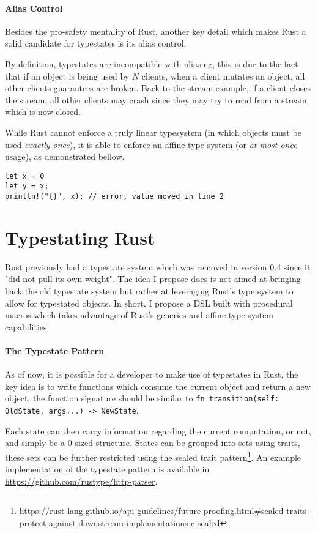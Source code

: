 \documentclass{article}
\begin{document}
\paragraph{Alias Control}

Besides the pro-safety mentality of Rust,
another key detail which makes Rust a solid candidate for typestates is its alias control.

By definition, typestates are incompatible with aliasing,
this is due to the fact that if an object is being used by $N$ clients,
when a client mutates an object, all other clients guarantees are broken.
Back to the stream example, if a client closes the stream,
all other clients may crash since they may try to read from a stream which is now closed.

While Rust cannot enforce a truly linear typesystem (in which objects must be used \emph{exactly once}),
it is able to enforce an affine type system (or \emph{at most once} usage), as demonstrated bellow.


\begin{verbatim}
let x = 0
let y = x;
println!("{}", x); // error, value moved in line 2
\end{verbatim}

\section*{Typestating Rust}

Rust previously had a typestate system which was removed in version 0.4 since it "did not pull its own weight".
The idea I propose does is not aimed at bringing back the old typestate system but rather at leveraging Rust's type system to allow for typestated objects.
In short, I propose a DSL built with procedural macros which takes advantage of Rust's generics and affine type system capabilities.

\paragraph{The Typestate Pattern}

As of now, it is possible for a developer to make use of typestates in Rust,
the key idea is to write functions which consume the current object and return a new object,
the function signature should be similar to \texttt{fn transition(self: OldState, args...) -> NewState}.

Each state can then carry information regarding the current computation, or not, and simply be a 0-sized structure.
States can be grouped into sets using traits,
these sets can be further restricted using the sealed trait pattern\footnote{\url{https://rust-lang.github.io/api-guidelines/future-proofing.html\#sealed-traits-protect-against-downstream-implementations-c-sealed}}.
An example implementation of the typestate pattern is available in \url{https://github.com/rustype/http-parser}.
\end{document}
